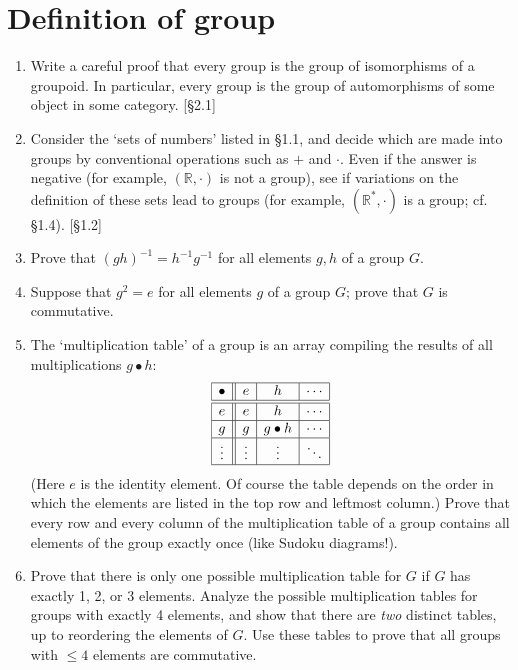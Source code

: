 \section{Definition of group}
\begin{enumerate}
    \item Write a careful proof that every group is the group of isomorphisms of a groupoid. In particular, every group is the group of automorphisms of some object in some category. [\S2.1]

    \item Consider the `sets of numbers' listed in \S1.1, and decide which are made into groups by conventional operations such as $+$ and $\cdot$. Even if the answer is negative (for example, $(\mathbb{R}, \cdot)$ is not a group), see if variations on the definition of these sets lead to groups (for example, $(\mathbb{R}^*,\cdot)$ is a group; cf. \S1.4). [\S1.2]

    \item Prove that $(gh)^{-1} = h^{-1}g^{-1}$ for all elements $g, h$ of a group $G$.

    \item Suppose that $g^2 = e$ for all elements $g$ of a group $G$; prove that $G$ is commutative.

    \item The `multiplication table' of a group is an array compiling the results of all multiplications $g \bullet h$:
          \[
              \begin{array}{|c||c|c|c|}
                  \hline
                  \bullet & e      & h           & \cdots \\
                  \hline\hline
                  e       & e      & h           & \cdots \\
                  \hline
                  g       & g      & g \bullet h & \cdots \\
                  \hline
                  \vdots  & \vdots & \vdots      & \ddots \\
                  \hline
              \end{array}
          \]
          (Here $e$ is the identity element. Of course the table depends on the order in which the elements are listed in the top row and leftmost column.) Prove that every row and every column of the multiplication table of a group contains all elements of the group exactly once (like Sudoku diagrams!).

    \item Prove that there is only one possible multiplication table for $G$ if $G$ has exactly 1, 2, or 3 elements. Analyze the possible multiplication tables for groups with exactly 4 elements, and show that there are \textit{two} distinct tables, up to reordering the elements of $G$. Use these tables to prove that all groups with $\le 4$ elements are commutative.


\end{enumerate}
